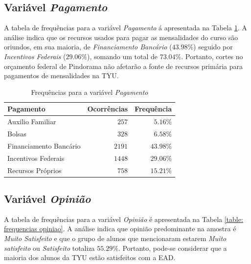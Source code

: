 \documentclass[10pt,a4paper,oneside]{article}
\begin{document}
\subsection*{Variável \textit{Pagamento}}

A tabela de frequências para a variável \textit{Pagamento} á apresentada na Tabela \ref{table: frequencias pagamento}. A análise indica que os recursos usados para pagar as mensalidades do curso são oriundos, em sua maioria, de \textit{Financiamento Bancário} ($43.98\%$) seguido por \textit{Incentivos Federais} ($29.06\%$), somando um total de $73.04\%$. Portanto, cortes no orçamento federal de Pindorama não afetarão a fonte de recursos primária para pagamentos de mensalidades na TYU.

\begin{table}[h]
\small
\centering
\caption{Frequências para a variável \textit{Pagamento}}
\label{table: frequencias pagamento}
\vspace{0.5em}
\begin{tabular}{l r r}
	\toprule
	\textbf{Pagamento}     & \textbf{Ocorrências} & \textbf{Frequência} \\
	\midrule
	Auxilio Familiar       & $257$                & $5.16\%$            \\
	Bolsas                 & $328$                & $6.58\%$            \\
	Financiamento Bancário & $2191$               & $43.98\%$           \\
	Incentivos Federais    & $1448$               & $29.06\%$           \\
	Recursos Próprios      & $758$                & $15.21\%$           \\
	\bottomrule
\end{tabular}
\end{table}

\subsection*{Variável \textit{Opinião}}

A tabela de frequências para a variável \textit{Opinião} é apresentada na Tabela \ref{table: frequencias opiniao}. A análise indica que opinião predominante na amostra é \textit{Muito Satisfeito} e que o grupo de alunos que mencionaram estarem \textit{Muito satisfeito} ou \textit{Satisfeito} totaliza $55.29\%$. Portanto, pode-se considerar que a maioria dos alunos da TYU estão satisfeitos com a EAD.
\end{document}
